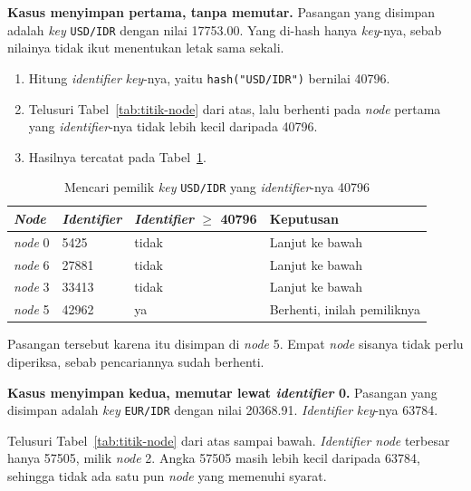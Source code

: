 \textbf{Kasus menyimpan pertama, tanpa memutar.} Pasangan yang disimpan adalah
\textit{key} \texttt{USD/IDR} dengan nilai 17753.00. Yang di-hash hanya \textit{key}-nya, sebab
nilainya tidak ikut menentukan letak sama sekali.

\begin{enumerate}
  \item Hitung \textit{identifier} \textit{key}-nya, yaitu \texttt{hash("USD/IDR")} bernilai 40796.
  \item Telusuri Tabel~\ref{tab:titik-node} dari atas, lalu berhenti pada
    \textit{node} pertama yang \textit{identifier}-nya tidak lebih kecil daripada 40796.
  \item Hasilnya tercatat pada Tabel~\ref{tab:simpan-usd}.
\end{enumerate}

\begin{table}[htbp]
  \centering
  \caption{Mencari pemilik \textit{key} \texttt{USD/IDR} yang \textit{identifier}-nya 40796}
  \label{tab:simpan-usd}
  \begin{tabularx}{\textwidth}{|l|l|l|X|}
    \hline
    \textbf{\textit{Node}} & \textbf{\textit{Identifier}} & \textbf{\textit{Identifier} $\geq$ 40796} & \textbf{Keputusan} \\
    \hline
    \textit{node} 0 & 5425 & tidak & Lanjut ke bawah \\
    \hline
    \textit{node} 6 & 27881 & tidak & Lanjut ke bawah \\
    \hline
    \textit{node} 3 & 33413 & tidak & Lanjut ke bawah \\
    \hline
    \textit{node} 5 & 42962 & ya & Berhenti, inilah pemiliknya \\
    \hline
  \end{tabularx}
\end{table}

Pasangan tersebut karena itu disimpan di \textit{node} 5. Empat \textit{node}
sisanya tidak perlu diperiksa, sebab pencariannya sudah berhenti.

\textbf{Kasus menyimpan kedua, memutar lewat \textit{identifier} 0.} Pasangan yang disimpan
adalah \textit{key} \texttt{EUR/IDR} dengan nilai 20368.91. \textit{Identifier} \textit{key}-nya 63784.

Telusuri Tabel~\ref{tab:titik-node} dari atas sampai bawah. \textit{Identifier node}
terbesar hanya 57505, milik \textit{node} 2. Angka 57505 masih lebih kecil
daripada 63784, sehingga tidak ada satu pun \textit{node} yang memenuhi syarat.

